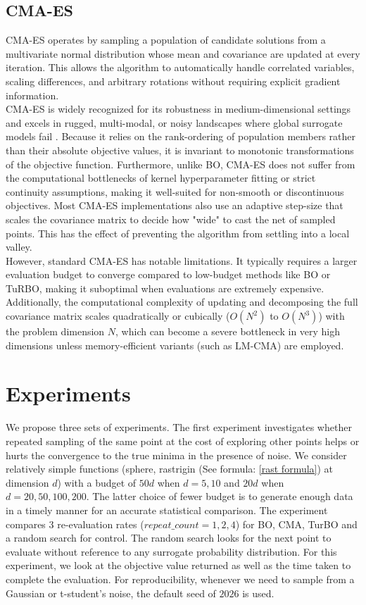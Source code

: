 \documentclass[12pt]{article}
\begin{document}
\subsection{CMA-ES}
CMA-ES operates by sampling a population of candidate solutions from a multivariate normal distribution whose mean and covariance are updated at every iteration. This allows the algorithm to automatically handle correlated variables, scaling differences, and arbitrary rotations without requiring explicit gradient information.\\

CMA-ES is widely recognized for its robustness in medium-dimensional settings and excels in rugged, multi-modal, or noisy landscapes where global surrogate models fail \cite{CMA}. Because it relies on the rank-ordering of population members rather than their absolute objective values, it is invariant to monotonic transformations of the objective function. Furthermore, unlike BO, CMA-ES does not suffer from the computational bottlenecks of kernel hyperparameter fitting or strict continuity assumptions, making it well-suited for non-smooth or discontinuous objectives. Most CMA-ES implementations also use an adaptive step-size that scales the covariance matrix to decide how "wide" to cast the net of sampled points. This has the effect of preventing the algorithm from settling into a local valley.\\

However, standard CMA-ES has notable limitations. It typically requires a larger evaluation budget to converge compared to low-budget methods like BO or TuRBO, making it suboptimal when evaluations are extremely expensive. Additionally, the computational complexity of updating and decomposing the full covariance matrix scales quadratically or cubically ($O(N^2)$ to $O(N^3)$) with the problem dimension $N$, which can become a severe bottleneck in very high dimensions unless memory-efficient variants (such as LM-CMA) are employed.

\section{Experiments}
We propose three sets of experiments. The first experiment investigates whether repeated sampling of the same point at the cost of exploring other points helps or hurts the convergence to the true minima in the presence of noise. We consider relatively simple functions (sphere, rastrigin (See formula: \ref{rast formula}) at dimension $d$) with a budget of $50d$ when $d = 5,10$ and $20d$ when $d = 20, 50, 100, 200$. The latter choice of fewer budget is to generate enough data in a timely manner for an accurate statistical comparison. The experiment compares 3 re-evaluation rates ($repeat\_count = 1,2,4$) for BO, CMA, TurBO and a random search for control. The random search looks for the next point to evaluate without reference to any surrogate probability distribution. For this experiment, we look at the objective value returned as well as the time taken to complete the evaluation. For reproducibility, whenever we need to sample from a Gaussian or t-student's noise, the default seed of $2026$ is used.\\
\end{document}

